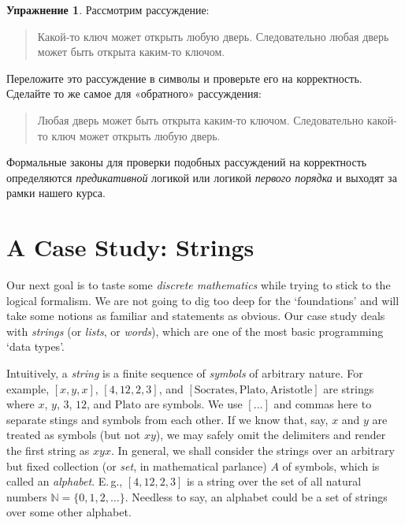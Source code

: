 \documentclass[12pt,notitlepage]{article}
\theoremstyle{plain}
\theoremstyle{definition}
\newtheorem{exc}[thm]{Упражнение}
\theoremstyle{plain}
\newcommand{\N}{\mathbb{N}}
\newcommand{\1}{\mathbf{1}}
\newcommand{\0}{\mathbf{0}}
\newcommand{\mcomm}[1]{}
\begin{document}
\begin{exc}
	Рассмотрим рассуждение:
	\begin{quote}
		Какой-то ключ может открыть любую дверь. Следовательно любая дверь может быть открыта каким-то ключом.
	\end{quote}
	Переложите это рассуждение в символы и проверьте его на корректность. Сделайте то же самое для «обратного» рассуждения:
	\begin{quote}
		Любая дверь может быть открыта каким-то ключом. Следовательно какой-то ключ может открыть любую дверь.
	\end{quote}
	
\end{exc}

Формальные законы для проверки подобных рассуждений на корректность определяются \emph{предикативной} логикой или логикой \emph{первого порядка} и выходят за рамки нашего курса.

\section{A Case Study: Strings}\label{sect:strings}

\mcomm{This section introduces an `inductive type' of strings without much `foundational' explanation. The main goal is to present the ideas of induction and recursion (which we looked upon as the heart of `discrete mathematics') without boring traditional examples of summing consecutive naturals, etc. We see this especially useful when the students have some (functional) programming experience. This section has few (if any) dependencies in the Course and may thus be freely omitted.}

Our next goal is to taste some \emph{discrete mathematics} while trying to stick to the logical formalism. We are not going to dig too deep for the `foundations' and will take some notions as familiar and statements as obvious. Our case study deals with \emph{strings} (or \emph{lists}, or \emph{words}), which are one of the most basic programming `data types'.

Intuitively, a \emph{string} is a finite sequence of \emph{symbols} of arbitrary nature. For example, $[x, y, x]$, $[4, 12, 2, 3]$, and $[\mbox{Socrates}, \mbox{Plato}, \mbox{Aristotle}]$ are strings where $x$, $y$, $3$, $12$, and $\mbox{Plato}$ are symbols. We use $[\ldots]$ and commas here to separate stings and symbols from each other. If we know that, say, $x$ and $y$ are treated as symbols (but not $xy$), we may safely omit the delimiters and render the first string as $xyx$. In general, we shall consider the strings over an arbitrary but fixed collection (or \emph{set}, in mathematical parlance) $A$ of symbols, which is called an \emph{alphabet}. E.\,g., $[4, 12, 2, 3]$ is a string over the set of all natural numbers $\N = \{0,1,2,\ldots\}$. Needless to say, an alphabet could be a set of strings over some other alphabet.
\end{document}
